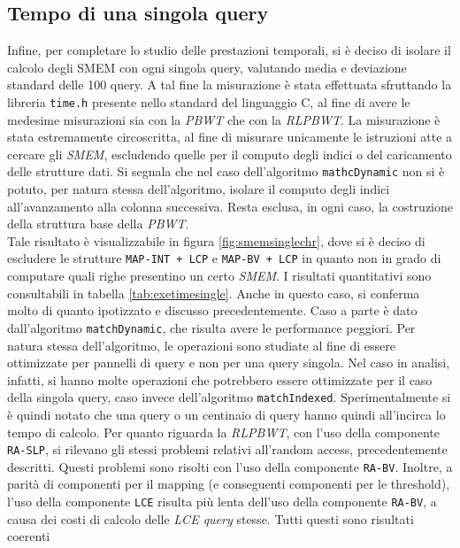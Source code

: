 \subsection{Tempo di una singola query}
Infine, per completare lo studio delle prestazioni temporali, si è deciso di
isolare il calcolo degli SMEM con ogni singola query, valutando media e
deviazione standard delle 100 query. A tal fine la misurazione è stata
effettuata sfruttando la libreria \texttt{time.h} presente nello standard del
linguaggio C, al fine di avere le medesime misurazioni sia con la \textit{PBWT}
che con la \textit{RLPBWT}. La misurazione è stata estremamente circoscritta, al
fine di misurare unicamente le istruzioni atte a cercare gli \textit{SMEM},
escludendo quelle per il computo degli indici o del caricamento delle strutture
dati.
Si segnala che nel caso dell'algoritmo \texttt{mathcDynamic} non si è
potuto, per natura stessa dell'algoritmo, isolare il computo degli indici
all'avanzamento alla colonna successiva. Resta esclusa, in ogni caso, la
costruzione della struttura base della \textit{PBWT}.
\\
Tale risultato è visualizzabile in figura
\ref{fig:smemsinglechr}, dove si è deciso di escludere le strutture
\texttt{MAP-INT + LCP} e \texttt{MAP-BV + LCP} in quanto non in grado di
computare quali righe presentino un certo \textit{SMEM}. I risultati
quantitativi sono consultabili in tabella \ref{tab:exetimesingle}. Anche in
questo caso, 
si conferma molto di quanto ipotizzato e discusso precedentemente. Caso a parte
è dato dall'algoritmo \texttt{matchDynamic}, che risulta avere le performance
peggiori. Per natura stessa dell'algoritmo, 
le operazioni sono studiate al fine di essere ottimizzate per pannelli di query
e non per una query singola. Nel caso in analisi, infatti, si hanno molte
operazioni che potrebbero essere ottimizzate per il caso della singola
query, caso invece dell'algoritmo \texttt{matchIndexed}. Sperimentalmente si è
quindi notato che una query o un centinaio di query hanno quindi all'incirca lo
tempo di calcolo. Per quanto riguarda la \textit{RLPBWT}, con l'uso della
componente \texttt{RA-SLP}, si rilevano gli stessi problemi relativi all'random
access, precedentemente descritti. Questi problemi sono risolti con l'uso della
componente \texttt{RA-BV}. Inoltre, a parità di componenti per il mapping (e
conseguenti componenti per le threshold), l'uso della componente \texttt{LCE}
risulta più lenta dell'uso della componente \texttt{RA-BV}, a causa dei costi di
calcolo delle \textit{LCE query} stesse. Tutti questi sono risultati coerenti
